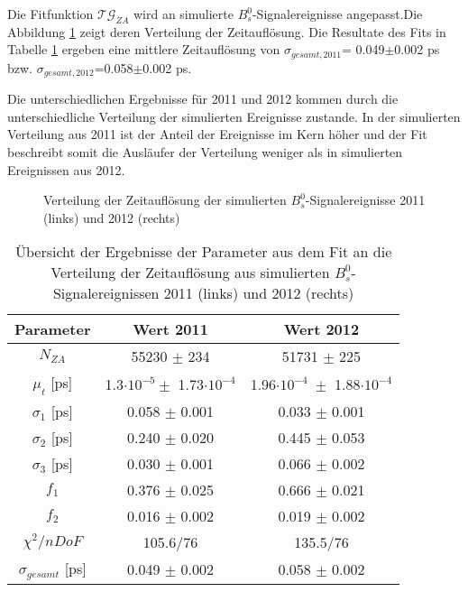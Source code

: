 \documentclass{article}
\begin{document}
Die Fitfunktion $\mathcal{TG}_{ZA}$ wird an simulierte $B_s^0$-Signalereignisse angepasst.Die Abbildung \ref{fig:MCsignaltres} zeigt deren Verteilung der Zeitauflösung. Die Resultate des Fits in Tabelle \ref{table:fitsignalMC} ergeben eine mittlere Zeitauflösung von $\sigma_{gesamt,2011}$= 0.049$\pm$0.002 ps bzw. $\sigma_{gesamt,2012}$=0.058$\pm$0.002 ps.

Die unterschiedlichen Ergebnisse für 2011 und 2012 kommen durch die unterschiedliche Verteilung der simulierten Ereignisse zustande. In der simulierten Verteilung aus 2011 ist der Anteil der Ereignisse im Kern höher und der Fit beschreibt somit die Ausläufer der Verteilung weniger als in simulierten Ereignissen aus 2012.

\begin{figure}[h!]
\caption{Verteilung der Zeitauflösung der simulierten $B_s^0$-Signalereignisse 2011 (links) und 2012 (rechts)}
\label{fig:MCsignaltres}
\end{figure} 

\begin{table}[h!]
\noindent \begin{centering}
\begin{tabular}{c|c|c}
Parameter & Wert 2011& Wert 2012 \tabularnewline
\hline 
$N_{ZA}$ & 55230 $\pm$ 234& 51731 $\pm$ 225 \tabularnewline
$\mu_t$ [ps]& 1.3$\cdot 10^{-5} \pm$ 1.73$\cdot 10^{-4}$ & 1.96$\cdot 10^{-4}\;\pm$ 1.88$\cdot 10^{-4}$ \tabularnewline
$\sigma_1$ [ps]& 0.058 $\pm$ 0.001& 0.033 $\pm$ 0.001 \tabularnewline
$\sigma_2$ [ps]& 0.240 $\pm$ 0.020& 0.445 $\pm$ 0.053 \tabularnewline
$\sigma_3$ [ps]& 0.030 $\pm$ 0.001& 0.066 $\pm$ 0.002 \tabularnewline
$f_1$ & 0.376 $\pm$ 0.025 & 0.666 $\pm$ 0.021\tabularnewline
$f_2$ & 0.016 $\pm$ 0.002& 0.019 $\pm$ 0.002 \tabularnewline
\hline
$\chi^2/nDoF$ & 105.6/76 & 135.5/76 \tabularnewline
\hline
$\sigma_{gesamt}$ [ps]& 0.049 $\pm$ 0.002 & 0.058 $\pm$ 0.002 \tabularnewline
\end{tabular}
\par \end{centering}
\caption{Übersicht der Ergebnisse der Parameter aus dem Fit an die Verteilung der Zeitauflösung aus simulierten $B_s^0$-Signalereignissen 2011 (links) und 2012 (rechts)}
\label{table:fitsignalMC}
\end{table}
\end{document}
